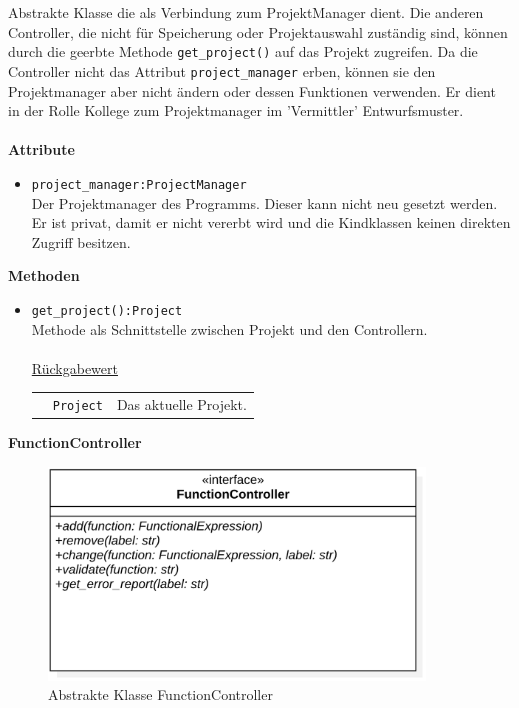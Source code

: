 \documentclass{article}
\begin{document}
\begin{itemize}
Abstrakte Klasse die als Verbindung zum ProjektManager dient. Die anderen Controller, die nicht für Speicherung oder Projektauswahl zuständig sind, können durch die geerbte Methode \texttt{get\_project()} auf das Projekt zugreifen. Da die Controller nicht das Attribut \texttt{project\_manager} erben, können sie den Projektmanager aber nicht ändern oder dessen Funktionen verwenden. Er dient in der Rolle Kollege zum 
Projektmanager im 'Vermittler' Entwurfsmuster.
\\\\
\textbf{\large{Attribute}}
\begin{itemize}
\item \texttt{project\_manager:ProjectManager}\\ Der Projektmanager des Programms. Dieser kann nicht neu gesetzt werden. Er ist privat, damit er nicht vererbt wird und die Kindklassen keinen direkten Zugriff besitzen.
\end{itemize}\leavevmode\newline
\textbf{\large{Methoden}}
\begin{itemize}
\item \texttt{get\_project():Project}\\ Methode als Schnittstelle zwischen Projekt und den Controllern.\\\\
\underline{{Rückgabewert}}\\
\begin{tabular}{lll}
 & \texttt{Project} & Das aktuelle Projekt. \\
\end{tabular}
\end{itemize}



\newpage
\textbf{\large{FunctionController}}
\begin{figure}[H]%
    \centering
    \includegraphics[width=10cm]{entwurf/Floriane/FunctionController.png}
    \caption{Abstrakte Klasse FunctionController}
\end{figure}



\end{itemize}
\end{document}

